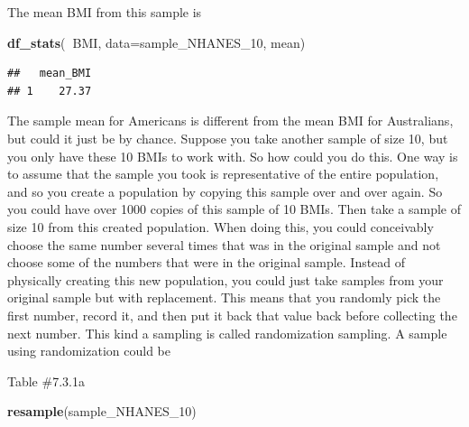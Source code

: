 \documentclass[]{book}
\newenvironment{Shaded}{\begin{snugshade}}{\end{snugshade}}
\newcommand{\DataTypeTok}[1]{\textcolor[rgb]{0.13,0.29,0.53}{#1}}
\newcommand{\DecValTok}[1]{\textcolor[rgb]{0.00,0.00,0.81}{#1}}
\newcommand{\KeywordTok}[1]{\textcolor[rgb]{0.13,0.29,0.53}{\textbf{#1}}}
\newcommand{\NormalTok}[1]{#1}
\newcommand{\OperatorTok}[1]{\textcolor[rgb]{0.81,0.36,0.00}{\textbf{#1}}}
\begin{document}
The mean BMI from this sample is

\begin{Shaded}
\begin{Highlighting}[]
\KeywordTok{df_stats}\NormalTok{(}\OperatorTok{~}\NormalTok{BMI, }\DataTypeTok{data=}\NormalTok{sample_NHANES_}\DecValTok{10}\NormalTok{, mean)}
\end{Highlighting}
\end{Shaded}

\begin{verbatim}
##   mean_BMI
## 1    27.37
\end{verbatim}

The sample mean for Americans is different from the mean BMI for Australians, but could it just be by chance. Suppose you take another sample of size 10, but you only have these 10 BMIs to work with. So how could you do this. One way is to assume that the sample you took is representative of the entire population, and so you create a population by copying this sample over and over again. So you could have over 1000 copies of this sample of 10 BMIs. Then take a sample of size 10 from this created population. When doing this, you could conceivably choose the same number several times that was in the original sample and not choose some of the numbers that were in the original sample. Instead of physically creating this new population, you could just take samples from your original sample but with replacement. This means that you randomly pick the first number, record it, and then put it back that value back before collecting the next number. This kind a sampling is called randomization sampling. A sample using randomization could be

Table \#7.3.1a

\begin{Shaded}
\begin{Highlighting}[]
\KeywordTok{resample}\NormalTok{(sample_NHANES_}\DecValTok{10}\NormalTok{)}
\end{Highlighting}
\end{Shaded}
\end{document}
